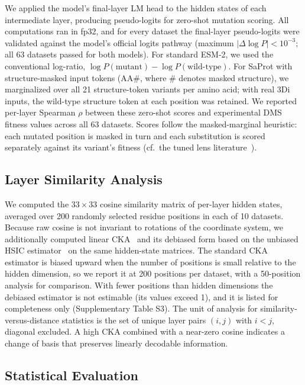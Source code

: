 \documentclass[11pt,a4paper]{article}
\newcommand{\revised}[1]{#1}
\newcommand{\rtwo}[1]{#1}
\newcommand{\rthree}[1]{#1}
\begin{document}
\revised{We applied the model's final-layer LM head to the hidden states of each
intermediate layer, producing pseudo-logits for zero-shot mutation scoring. All
computations ran in fp32, and for every dataset the final-layer pseudo-logits were
validated against the model's official logits pathway (maximum $|\Delta \log P| <
10^{-3}$; all 63 datasets passed for both models). For standard ESM-2, we used the
conventional log-ratio, $\log P(\text{mutant}) - \log P(\text{wild-type})$. For SaProt
with structure-masked input tokens ($\text{AA}\#$, where $\#$ denotes masked
structure), we marginalized over all 21 structure-token variants per amino acid; with
real 3Di inputs, the wild-type structure token at each position was retained. We
reported per-layer Spearman $\rho$ between these zero-shot scores and experimental
DMS fitness values across all 63 datasets. \rtwo{Scores follow the masked-marginal
heuristic: each mutated position is masked in turn and each substitution is scored
separately against its variant's fitness (cf.\ the tuned lens
literature~\cite{belrose2023eliciting}).}}

\subsection{Layer Similarity Analysis}

\revised{We computed the $33 \times 33$ cosine similarity matrix of per-layer hidden states,
averaged over \rthree{200 randomly selected residue positions in each of} 10 datasets. Because raw
cosine is not invariant to rotations of the coordinate system, we additionally computed
linear CKA~\cite{kornblith2019similarity} \rtwo{and its debiased form based on the
unbiased HSIC estimator~\cite{song2012feature}} on the same hidden-state matrices.
\rthree{The standard CKA estimator is biased upward when the number of positions is
small relative to the hidden dimension, so we report it at 200 positions per dataset,
with a 50-position analysis for comparison. With fewer positions than hidden dimensions
the debiased estimator is not estimable (its values exceed 1), and it is listed for
completeness only (Supplementary Table S3).} The unit
of analysis for similarity-versus-distance statistics is the set of unique layer pairs
$(i, j)$ with $i < j$, diagonal excluded. A high CKA combined with a near-zero cosine
indicates a change of basis that preserves linearly decodable information.}

\subsection{Statistical Evaluation}
\end{document}
